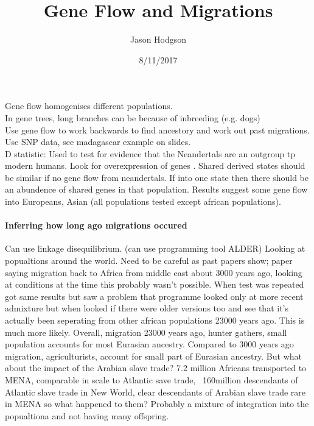 \documentclass[11pt]{article}
\title{Gene Flow and Migrations}
\author{Jason Hodgson}
\date{8/11/2017}
\begin{document}
\maketitle
Gene flow homogenises different populations. \\
In gene trees, long branches can be because of inbreeding (e.g. dogs)\\
Use gene flow to work backwards to find ancestory and work out past migrations. Use SNP data, see madagascar example on slides.\\
D statistic: Used to test for evidence that the Neandertals are an outgroup tp modern humans. Look for overexpression of genes . Shared derived states should be similar if no gene flow from neandertals. If into one state then there should be an abundence of shared genes in that population. Results suggest some gene flow into Europeans, Asian (all populations tested except african populations). \\
\paragraph{Inferring how long ago migrations occured}
Can use linkage disequilibrium. (can use programming tool ALDER) Looking at popualtions around the world. Need to be careful as past papers show; paper saying migration back to Africa from middle east about 3000 years ago, looking at conditions at the time this probably wasn't possible. When test was repeated got same results but saw a problem that programme looked only at more recent admixture but when looked if there were older versions too and see that it's actually been seperating from other african populations 23000 years ago. This is much more likely. Overall, migration 23000 years ago, hunter gathers, small population accounts for most Eurasian ancestry. Compared to 3000 years ago migration, agriculturists, account for small part of Eurasian ancestry. But what about the impact of the Arabian slave trade? 7.2 million Africans transported to MENA, comparable in scale to Atlantic save trade, ~160million descendants of Atlantic slave trade in New World, clear descendants of Arabian slave trade rare in MENA so what happened to them? Probably a mixture of integration into the popualtiona and not having many offspring. 
\end{document}
